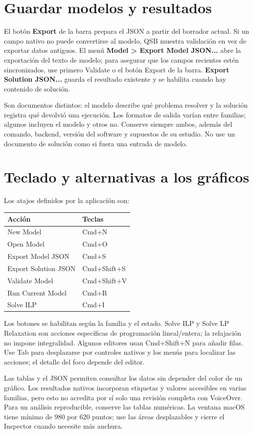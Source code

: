 \section{Guardar modelos y resultados}
El botón \textbf{Export} de la barra prepara el JSON a partir del borrador
actual. Si un campo nativo no puede convertirse al modelo, QSB muestra
validación en vez de exportar datos antiguos. El menú
\textbf{Model > Export Model JSON...} abre la exportación del texto de modelo;
para asegurar que los campos recientes estén sincronizados, use primero
Validate o el botón Export de la barra.
\textbf{Export Solution JSON...} guarda el resultado existente y se habilita
cuando hay contenido de solución.

Son documentos distintos: el modelo describe qué problema resolver y la
solución registra qué devolvió una ejecución. Los formatos de salida varían
entre familias; algunos incluyen el modelo y otros no. Conserve siempre ambos,
además del comando, backend, versión del software y supuestos de su estudio.
No use un documento de solución como si fuera una entrada de modelo.

\section{Teclado y alternativas a los gráficos}
Los atajos definidos por la aplicación son:
\begin{center}
\begin{tabular}{ll}
\toprule
Acción & Teclas\\
\midrule
New Model & Cmd+N\\
Open Model & Cmd+O\\
Export Model JSON & Cmd+S\\
Export Solution JSON & Cmd+Shift+S\\
Validate Model & Cmd+Shift+V\\
Run Current Model & Cmd+R\\
Solve ILP & Cmd+I\\
\bottomrule
\end{tabular}
\end{center}
Los botones se habilitan según la familia y el estado. Solve ILP y Solve LP
Relaxation son acciones específicas de programación lineal/entera; la relajación
no impone integralidad. Algunos editores usan Cmd+Shift+N para añadir filas.
Use Tab para desplazarse por controles nativos y los menús para localizar las
acciones; el detalle del foco depende del editor.

Las tablas y el JSON permiten consultar los datos sin depender del color de un
gráfico. Los resultados nativos incorporan etiquetas y valores accesibles en
varias familias, pero esto no acredita por sí solo una revisión completa con
VoiceOver. Para un análisis reproducible, conserve las tablas numéricas. La
ventana macOS tiene mínimo de 980 por 620 puntos; use las áreas desplazables y
cierre el Inspector cuando necesite más anchura.

